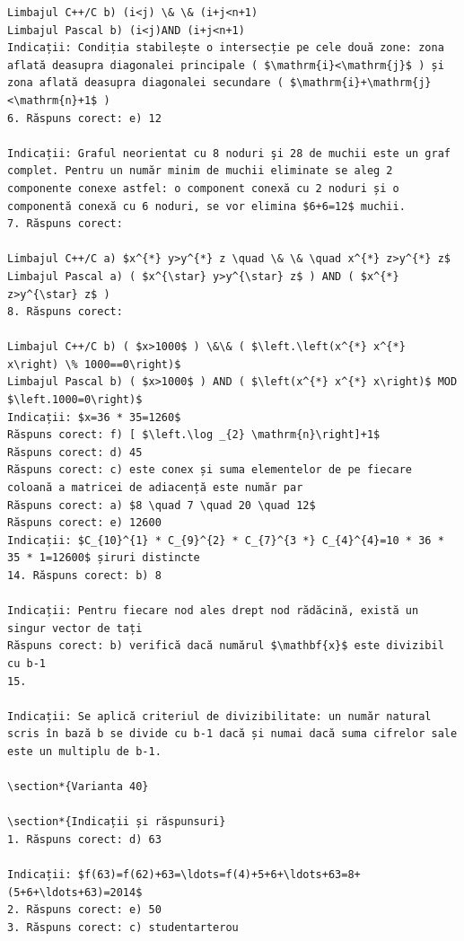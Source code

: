 \documentclass[10pt]{article}
\begin{document}
\begin{verbatim}
Limbajul C++/C b) (i<j) \& \& (i+j<n+1)
Limbajul Pascal b) (i<j)AND (i+j<n+1)
Indicații: Condiția stabilește o intersecție pe cele două zone: zona aflată deasupra diagonalei principale ( $\mathrm{i}<\mathrm{j}$ ) și zona aflată deasupra diagonalei secundare ( $\mathrm{i}+\mathrm{j}<\mathrm{n}+1$ )
6. Răspuns corect: e) 12

Indicații: Graful neorientat cu 8 noduri şi 28 de muchii este un graf complet. Pentru un număr minim de muchii eliminate se aleg 2 componente conexe astfel: o component conexă cu 2 noduri și o componentă conexă cu 6 noduri, se vor elimina $6+6=12$ muchii.
7. Răspuns corect:

Limbajul C++/C a) $x^{*} y>y^{*} z \quad \& \& \quad x^{*} z>y^{*} z$
Limbajul Pascal a) ( $x^{\star} y>y^{\star} z$ ) AND ( $x^{*} z>y^{\star} z$ )
8. Răspuns corect:

Limbajul C++/C b) ( $x>1000$ ) \&\& ( $\left.\left(x^{*} x^{*} x\right) \% 1000==0\right)$
Limbajul Pascal b) ( $x>1000$ ) AND ( $\left(x^{*} x^{*} x\right)$ MOD $\left.1000=0\right)$
Indicații: $x=36 * 35=1260$
Răspuns corect: f) [ $\left.\log _{2} \mathrm{n}\right]+1$
Răspuns corect: d) 45
Răspuns corect: c) este conex și suma elementelor de pe fiecare coloană a matricei de adiacență este număr par
Răspuns corect: a) $8 \quad 7 \quad 20 \quad 12$
Răspuns corect: e) 12600
Indicații: $C_{10}^{1} * C_{9}^{2} * C_{7}^{3 *} C_{4}^{4}=10 * 36 * 35 * 1=12600$ șiruri distincte
14. Răspuns corect: b) 8

Indicații: Pentru fiecare nod ales drept nod rădăcină, există un singur vector de tați
Răspuns corect: b) verifică dacă numărul $\mathbf{x}$ este divizibil cu b-1
15.

Indicații: Se aplică criteriul de divizibilitate: un număr natural scris în bază b se divide cu b-1 dacă și numai dacă suma cifrelor sale este un multiplu de b-1.

\section*{Varianta 40}

\section*{Indicații și răspunsuri}
1. Răspuns corect: d) 63

Indicații: $f(63)=f(62)+63=\ldots=f(4)+5+6+\ldots+63=8+(5+6+\ldots+63)=2014$
2. Răspuns corect: e) 50
3. Răspuns corect: c) studentarterou


\end{verbatim}
\end{document}
